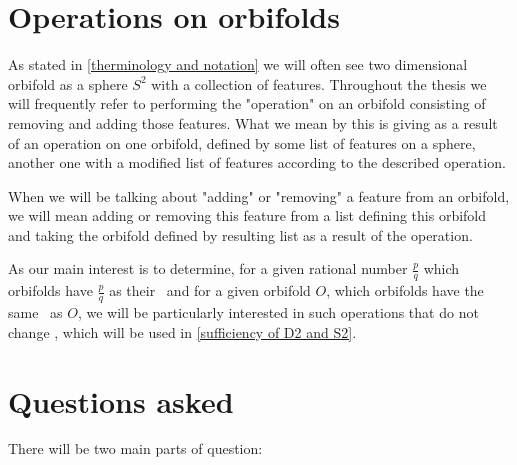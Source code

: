 
\section{Operations on orbifolds}\label{Operations}
As stated in \ref{therminology and notation} we will often see two dimensional orbifold 
as a sphere $S^2$ with a collection of features.
Throughout the thesis we will frequently refer to performing the "operation" on an orbifold 
consisting of removing and adding those features. 
What we mean by this is giving as a result of an operation on one orbifold, defined 
by some list of features on a sphere, another one 
with a modified list of features according to the described operation. 

When we will be talking about "adding" or "removing" a feature from an orbifold, we 
will mean adding or removing this feature from a list defining this orbifold and 
taking the orbifold defined by resulting list as a result of the operation.
 
As our main interest is to determine, for a given rational number 
$\frac{p}{q}$ which orbifolds have $\frac{p}{q}$ as their \Eoc\ and for a given 
orbifold $O$, which orbifolds 
have the same \Eoc\ as $O$, we will be particularly interested in such operations 
that do not change \Eoc, which will be used in \ref{sufficiency of D2 and S2}.





\label{moving from interior to boundary}


\section{Questions asked}
There will be two main parts of question: 

